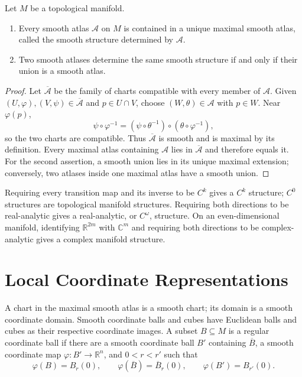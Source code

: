 \begin{proposition}
\label{prop:1-17}
\leanok
{}
Let $M$ be a topological manifold.
\begin{enumerate}
\item Every smooth atlas $\mathcal A$ on $M$ is contained in a unique maximal
smooth atlas, called the smooth structure determined by $\mathcal A$.
\item Two smooth atlases determine the same smooth structure if and only if
their union is a smooth atlas.
\end{enumerate}
\end{proposition}

\begin{proof}
\leanok
\sketch Let $\overline{\mathcal A}$ be the family of charts compatible with
every member of $\mathcal A$. Given $(U,\varphi),(V,\psi)\in
\overline{\mathcal A}$ and $p\in U\cap V$, choose $(W,\theta)\in\mathcal A$
with $p\in W$. Near $\varphi(p)$,
\[
\psi\circ\varphi^{-1}
=(\psi\circ\theta^{-1})\circ(\theta\circ\varphi^{-1}),
\]
so the two charts are compatible. Thus $\overline{\mathcal A}$ is smooth and
is maximal by its definition. Every maximal atlas containing $\mathcal A$ lies
in $\overline{\mathcal A}$ and therefore equals it. For the second assertion,
a smooth union lies in its unique maximal extension; conversely, two atlases
inside one maximal atlas have a smooth union.
\end{proof}


\begin{remark}
\label{rem:1-2-extra-6}
\mathlibok
Requiring every transition map and its inverse to be $C^k$ gives a $C^k$
structure; $C^0$ structures are topological manifold structures. Requiring
both directions to be real-analytic gives a real-analytic, or $C^\omega$,
structure. On an even-dimensional manifold, identifying $\mathbb R^{2m}$ with
$\mathbb C^m$ and requiring both directions to be complex-analytic gives a
complex manifold structure.
\end{remark}


\section{Local Coordinate Representations}

\begin{definition}
\label{def:1-3-extra-1}
\leanok
A chart in the maximal smooth atlas is a smooth chart; its domain is a smooth
coordinate domain. Smooth coordinate balls and cubes have Euclidean balls and
cubes as their respective coordinate images. A subset $B\subseteq M$ is a
regular coordinate ball if there are a smooth coordinate ball $B'$ containing
$\overline B$, a smooth coordinate map $\varphi:B'\to\mathbb R^n$, and
$0<r<r'$ such that
\[
\varphi(B)=B_r(0),\qquad
\varphi(\overline B)=\overline B_r(0),\qquad
\varphi(B')=B_{r'}(0).
\]
\end{definition}

